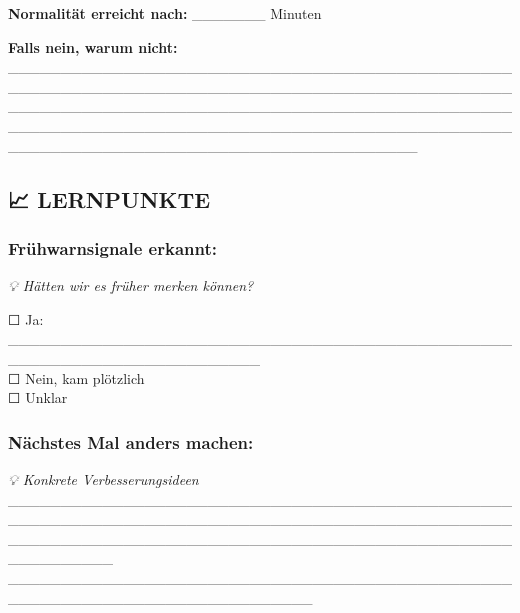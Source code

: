 \textbf{Normalität erreicht nach:} \_\_\_\_\_\_\_ Minuten

\textbf{Falls nein, warum nicht:}\\
\_\_\_\_\_\_\_\_\_\_\_\_\_\_\_\_\_\_\_\_\_\_\_\_\_\_\_\_\_\_\_\_\_\_\_\_\_\_\_\_\_\_\_\_\_\_\_\_\_\_\_\_\_\_\_\_\_\_\_\_\_\_\_\_\_\_\_\_\_\_\_\_\_\_\_\_\_\_\_\_\_\_\_\_\_\_\_\_\_\_\_\_\_\_\_\_\_\_\_\_\_\_\_\_\_\_\_\_\_\_\_\_\_\_\_\_\_\_\_\_\_\_\_\_\_\_\_\_\_\_\_\_\_\_\_\_\_\_\_\_\_\_\_\_\_\_\_\_\_\_\_\_\_\_\_\_\_\_\_\_\_\_\_\_\_\_\_\_\_\_\_\_\_\_\_\_\_\_\_\_\_\_\_\_\_\_\_\_\_\_\_\_\_\_\_\_\_\_\_\_\_\_\_\_\_\_\_\_\_\_\_\_\_\_\_\_\_\_\_\_\_\_\_\_\_\_\_\_\_\_\_

\hypertarget{lernpunkte}{%
\subsection{\texorpdfstring{\textbf{📈 LERNPUNKTE}}{📈 LERNPUNKTE}}\label{lernpunkte}}

\hypertarget{fruxfchwarnsignale-erkannt}{%
\subsubsection{\texorpdfstring{\textbf{Frühwarnsignale erkannt:}}{Frühwarnsignale erkannt:}}\label{fruxfchwarnsignale-erkannt}}

\emph{💡 Hätten wir es früher merken können?}

☐ Ja: \_\_\_\_\_\_\_\_\_\_\_\_\_\_\_\_\_\_\_\_\_\_\_\_\_\_\_\_\_\_\_\_\_\_\_\_\_\_\_\_\_\_\_\_\_\_\_\_\_\_\_\_\_\_\_\_\_\_\_\_\_\_\_\_\_\_\_\_\_\_\_\_\\
☐ Nein, kam plötzlich\\
☐ Unklar

\hypertarget{nuxe4chstes-mal-anders-machen}{%
\subsubsection{\texorpdfstring{\textbf{Nächstes Mal anders machen:}}{Nächstes Mal anders machen:}}\label{nuxe4chstes-mal-anders-machen}}

\emph{💡 Konkrete Verbesserungsideen} \_\_\_\_\_\_\_\_\_\_\_\_\_\_\_\_\_\_\_\_\_\_\_\_\_\_\_\_\_\_\_\_\_\_\_\_\_\_\_\_\_\_\_\_\_\_\_\_\_\_\_\_\_\_\_\_\_\_\_\_\_\_\_\_\_\_\_\_\_\_\_\_\_\_\_\_\_\_\_\_\_\_\_\_\_\_\_\_\_\_\_\_\_\_\_\_\_\_\_\_\_\_\_\_\_\_\_\_\_\_\_\_\_\_\_\_\_\_\_\_\_\_\_\_\_\_\_\_\_\_\_\_\_\_\_\_\_\_\_\_\_\_\_\_\_\_\_\_\_\_\_\_\_\_\\
\_\_\_\_\_\_\_\_\_\_\_\_\_\_\_\_\_\_\_\_\_\_\_\_\_\_\_\_\_\_\_\_\_\_\_\_\_\_\_\_\_\_\_\_\_\_\_\_\_\_\_\_\_\_\_\_\_\_\_\_\_\_\_\_\_\_\_\_\_\_\_\_\_\_\_\_\_

